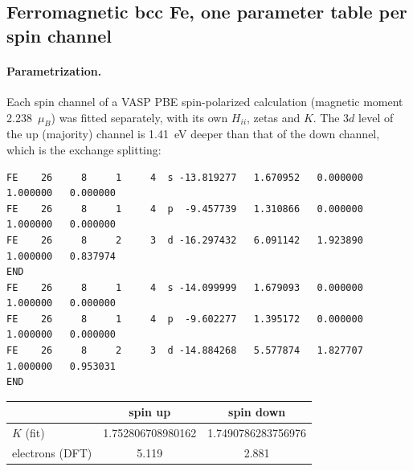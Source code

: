 \documentclass[11pt,a4paper]{article}
\newcommand{\file}[1]{\texttt{#1}}
\begin{document}
\subsection{Ferromagnetic bcc Fe, one parameter table per spin channel}

\paragraph{Parametrization.} Each spin channel of a VASP PBE spin-polarized calculation
(magnetic moment 2.238~$\mu_B$) was fitted separately, with its own $H_{ii}$, zetas and
$K$. The $3d$ level of the up (majority) channel is 1.41~eV deeper than that of the down
channel, which is the exchange splitting:
\begin{lstlisting}[style=sh,caption={\file{new\_tests/Fe\_spin/Fe\_up.dat} (top) and \file{Fe\_down.dat} (bottom)}]
FE    26     8     1     4  s -13.819277   1.670952   0.000000   1.000000   0.000000
FE    26     8     1     4  p  -9.457739   1.310866   0.000000   1.000000   0.000000
FE    26     8     2     3  d -16.297432   6.091142   1.923890   1.000000   0.837974
END
FE    26     8     1     4  s -14.099999   1.679093   0.000000   1.000000   0.000000
FE    26     8     1     4  p  -9.602277   1.395172   0.000000   1.000000   0.000000
FE    26     8     2     3  d -14.884268   5.577874   1.827707   1.000000   0.953031
END
\end{lstlisting}
\begin{center}
\begin{tabular}{l c c}
\toprule
 & spin up & spin down \\
\midrule
$K$ (fit) & 1.752806708980162 & 1.7490786283756976 \\
electrons (DFT) & 5.119 & 2.881 \\
\bottomrule
\end{tabular}
\end{center}
\end{document}
